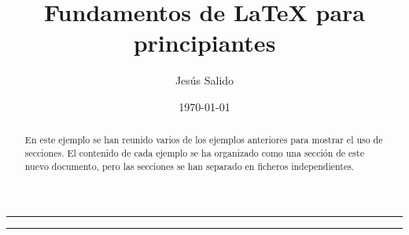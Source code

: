 \documentclass[11pt,a4paper]{article}
\author{Jesús Salido}
\title{Fundamentos de \LaTeX{} para principiantes}
\date{\today}
\begin{document}
\maketitle 

\begin{abstract}
En este ejemplo se han reunido varios de los ejemplos anteriores para mostrar el uso de secciones. El contenido de cada ejemplo se ha organizado como una sección de este nuevo documento, pero las secciones se han separado en ficheros independientes.
\end{abstract}

\hrule %
\tableofcontents %
\vspace{0.5cm} %
\hrule



\end{document}

